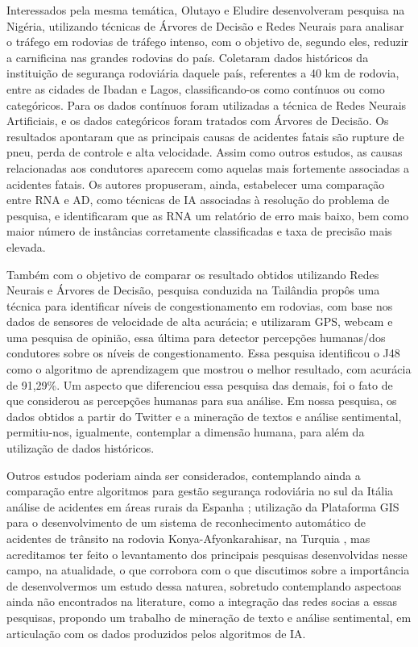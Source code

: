 Interessados pela mesma temática, Olutayo e Eludire \cite{olutayo2014traffic} desenvolveram pesquisa na Nigéria, utilizando técnicas de Árvores de Decisão e Redes Neurais para analisar o tráfego em rodovias de tráfego intenso, com o objetivo de, segundo eles, reduzir a carnificina nas grandes rodovias do país. Coletaram dados históricos da instituição de segurança rodoviária daquele país, referentes a 40 km de rodovia, entre as cidades de Ibadan e Lagos, classificando-os como contínuos ou como categóricos. Para os dados contínuos foram utilizadas a técnica de Redes Neurais Artificiais, e os dados categóricos foram tratados com Árvores de Decisão. Os resultados apontaram que as principais causas de acidentes fatais são rupture de pneu, perda de controle e alta velocidade. Assim como outros estudos, as causas relacionadas aos condutores aparecem como aquelas mais fortemente associadas a acidentes fatais. Os autores propuseram, ainda, estabelecer uma comparação entre RNA e AD, como técnicas de IA associadas à resolução do problema de pesquisa, e identificaram que as RNA um relatório de erro mais baixo, bem como maior número de instâncias corretamente classificadas e taxa de precisão mais elevada.

Também com o objetivo de comparar os resultado obtidos utilizando Redes Neurais e Árvores de Decisão, pesquisa conduzida na Tailândia \cite{thianniwet2010classification} propôs uma técnica para identificar níveis de congestionamento em rodovias, com base nos dados de sensores de velocidade de alta acurácia; e utilizaram GPS, webcam e uma pesquisa de opinião, essa última para detector percepções humanas/dos condutores sobre os níveis de congestionamento. Essa pesquisa identificou o J48 como o algoritmo de aprendizagem que mostrou o melhor resultado, com acurácia de 91,29\%. Um aspecto que diferenciou essa pesquisa das demais, foi o fato de que considerou as percepções humanas para sua análise. Em nossa pesquisa, os dados obtidos a partir do Twitter e a mineração de textos e análise sentimental, permitiu-nos, igualmente, contemplar a dimensão humana, para além da utilização de dados históricos.

Outros estudos poderiam ainda ser considerados, contemplando ainda a comparação entre algoritmos para gestão segurança rodoviária no sul da Itália \cite{de2015comparison} análise de acidentes em áreas rurais da Espanha \cite{de2011analysis};  utilização da Plataforma GIS para o desenvolvimento de um sistema de reconhecimento automático de acidentes de trânsito na rodovia Konya-Afyonkarahisar, na Turquia \cite{durduran2010decision}, mas acreditamos ter feito o levantamento dos principais pesquisas desenvolvidas nesse campo, na atualidade, o que corrobora com o que discutimos sobre a importância de desenvolvermos um estudo dessa naturea, sobretudo contemplando aspectoas ainda não encontrados na literature, como a integração das redes socias a essas pesquisas, propondo um trabalho de mineração de texto e análise sentimental, em articulação com os dados produzidos pelos algoritmos de IA.

